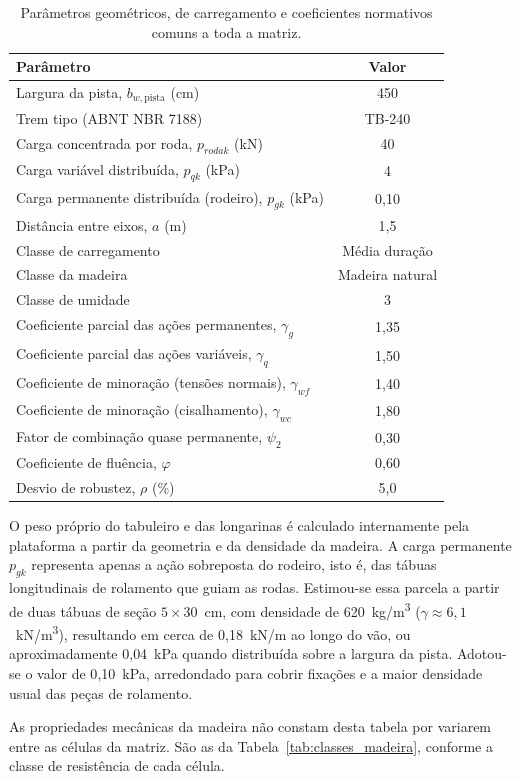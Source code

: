 \begin{table}[!ht]
\caption{Parâmetros geométricos, de carregamento e coeficientes normativos comuns a toda a matriz.\label{tab:parametros}}
\begin{threeparttable}
\begin{tabular*}{\columnwidth}{@{\extracolsep\fill}lc@{\extracolsep\fill}}
\toprule
Parâmetro & Valor \\
\midrule
Largura da pista, $b_{w,\mathrm{pista}}$ (cm) & 450 \\
Trem tipo (ABNT NBR 7188) & TB-240 \\
Carga concentrada por roda, $p_{rodak}$ (kN) & 40 \\
Carga variável distribuída, $p_{qk}$ (kPa) & 4 \\
Carga permanente distribuída (rodeiro), $p_{gk}$ (kPa)\tnote{a} & 0{,}10 \\
Distância entre eixos, $a$ (m) & 1{,}5 \\
Classe de carregamento & Média duração \\
Classe da madeira & Madeira natural \\
Classe de umidade & 3 \\
Coeficiente parcial das ações permanentes, $\gamma_g$ & 1{,}35 \\
Coeficiente parcial das ações variáveis, $\gamma_q$ & 1{,}50 \\
Coeficiente de minoração (tensões normais), $\gamma_{wf}$ & 1{,}40 \\
Coeficiente de minoração (cisalhamento), $\gamma_{wc}$ & 1{,}80 \\
Fator de combinação quase permanente, $\psi_2$ & 0{,}30 \\
Coeficiente de fluência, $\varphi$ & 0{,}60 \\
Desvio de robustez, $\rho$ (\%) & 5{,}0 \\
\bottomrule
\end{tabular*}
\begin{tablenotes}
\footnotesize
\item[a] O peso próprio do tabuleiro e das longarinas é calculado internamente pela plataforma a partir da geometria e da densidade da madeira. A carga permanente $p_{gk}$ representa apenas a ação sobreposta do rodeiro, isto é, das tábuas longitudinais de rolamento que guiam as rodas.
Estimou-se essa parcela a partir de duas tábuas de seção $5 \times 30$~cm, com densidade de 620~kg/m\textsuperscript{3} ($\gamma \approx 6{,}1$~kN/m\textsuperscript{3}), resultando em cerca de 0{,}18~kN/m ao longo do vão, ou aproximadamente 0{,}04~kPa quando distribuída sobre a largura da pista.
Adotou-se o valor de 0{,}10~kPa, arredondado para cobrir fixações e a maior densidade usual das peças de rolamento.
\item As propriedades mecânicas da madeira não constam desta tabela por variarem entre as células da matriz. São as da Tabela~\ref{tab:classes_madeira}, conforme a classe de resistência de cada célula.
\end{tablenotes}
\end{threeparttable}
\end{table}

